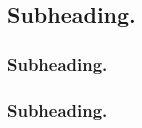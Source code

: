 \subsection*{Subheading.}

\lipsum[4]


\subsubsection*{Subheading.}

\lipsum[5]


\subsubsection*{Subheading.}

\lipsum[6]